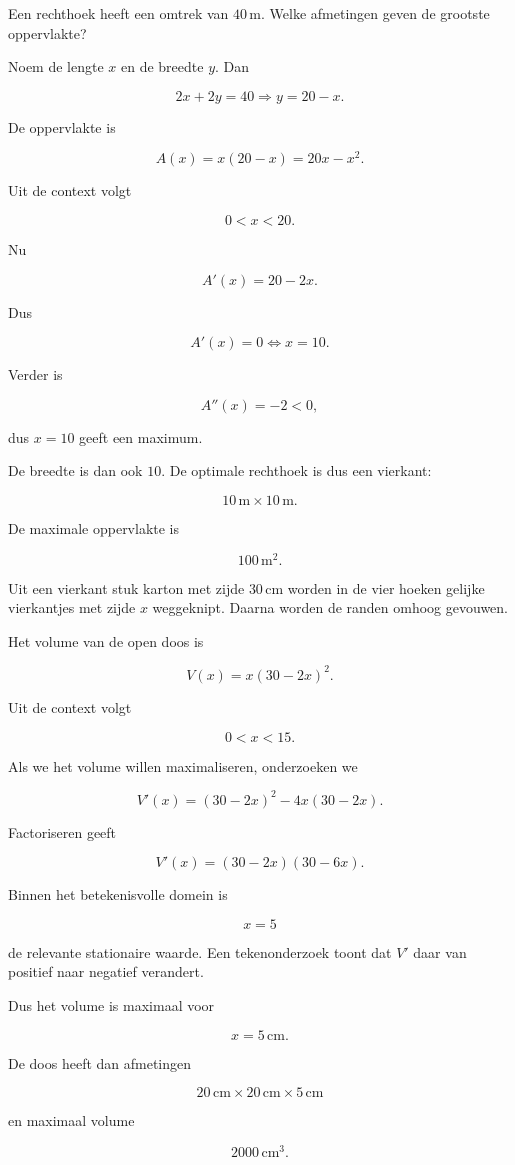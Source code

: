 \documentclass{ximera}
\begin{document}
\begin{voorbeeld}
Een rechthoek heeft een omtrek van \(40\,\mathrm{m}\).
Welke afmetingen geven de grootste oppervlakte?

Noem de lengte \(x\) en de breedte \(y\). Dan

\[
2x+2y=40
\Longrightarrow
y=20-x.
\]

De oppervlakte is

\[
A(x)=x(20-x)=20x-x^2.
\]

Uit de context volgt

\[0<x<20.\]

Nu

\[
A'(x)=20-2x.
\]

Dus

\[
A'(x)=0
\Longleftrightarrow
x=10.
\]

Verder is

\[A''(x)=-2<0,\]

dus \(x=10\) geeft een maximum.

De breedte is dan ook \(10\). De optimale rechthoek is dus een vierkant:

\[
\boxed{10\,\mathrm{m}\times10\,\mathrm{m}}.
\]

De maximale oppervlakte is

\[
\boxed{100\,\mathrm{m}^2}.
\]
\end{voorbeeld}

\begin{voorbeeld}
Uit een vierkant stuk karton met zijde \(30\,\mathrm{cm}\) worden in
de vier hoeken gelijke vierkantjes met zijde \(x\) weggeknipt. Daarna
worden de randen omhoog gevouwen.

Het volume van de open doos is

\[
V(x)=x(30-2x)^2.
\]

Uit de context volgt

\[0<x<15.\]

Als we het volume willen maximaliseren, onderzoeken we

\[
V'(x)
=
(30-2x)^2-4x(30-2x).
\]

Factoriseren geeft

\[
V'(x)=(30-2x)(30-6x).
\]

Binnen het betekenisvolle domein is

\[x=5\]

de relevante stationaire waarde. Een tekenonderzoek toont dat \(V'\)
daar van positief naar negatief verandert.

Dus het volume is maximaal voor

\[
\boxed{x=5\,\mathrm{cm}}.
\]

De doos heeft dan afmetingen

\[
20\,\mathrm{cm}\times20\,\mathrm{cm}\times5\,\mathrm{cm}
\]

en maximaal volume

\[
\boxed{2000\,\mathrm{cm}^3}.
\]
\end{voorbeeld}
\end{document}
